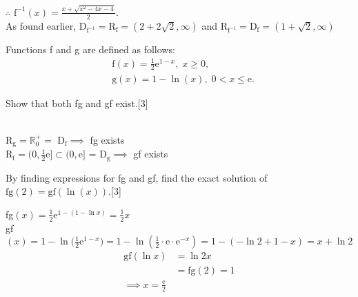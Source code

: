 \documentclass[12pt, a4 paper]{article}
\begin{document}
\begin{outline}[enumerate]
\begin{answer}
  $\therefore$\; $\textrm{f}^{-1}(x)=\frac{x+\sqrt{x^2-4x-4}}{2}$.\\
  As found earlier, $\textrm{D}_{\textrm{f}^{-1}}=\textrm{R}_{\textrm{f}}=(2+2\sqrt{2},\infty)$ and $\textrm{R}_{\textrm{f}^{-1}}=\textrm{D}_{\textrm{f}}=(1+\sqrt{2},\infty)$
 \end{answer}
 \1 Functions f and g are defined as follows:
 \begin{align*}
   & \textrm{f}(x)=\frac{1}{2}\mathrm{e}^{1-x},\;x\geq0, \\
   & \textrm{g}(x)=1-\ln{(x)},\;0<x\leq{\mathrm{e}}.
 \end{align*} %

 \2 Show that both fg and gf exist.\hfill[3]
 \begin{answer}
  \vspace{3mm}
  \color{black}
  \\
  \color{blue}
  R$_\textrm{g} = \mathbb{R}^+_0 =$ D$_\textrm{f}\implies$ fg exists \\
  R$_\textrm{f} = (0,\frac{1}{2}\mathrm{e}] \subset (0,\mathrm{e}]$ = D$_\textrm{g}\implies$ gf exists
 \end{answer}

 \2 By finding expressions for fg and gf, find the exact solution of $\textrm{fg}(2)=\textrm{gf}(\ln{(x)})$.\hfill[3]\\
 \begin{answer}
  fg$(x)=\frac{1}{2}\mathrm{e}^{1-(1-\ln{x})} = \frac{1}{2}x $ \\
  gf$(x) = 1-\ln{(\frac{1}{2}\mathrm{e}^{1-x}}) = 1-\ln{(\frac{1}{2}\cdot \mathrm{e} \cdot \mathrm{e}^{-x})} = 1-(-\ln2+1-x) = x+\ln2$
  \begin{align*}
   \textrm{gf}(\ln x) & = \ln2x              \\
                      & = \textrm{fg}(2) = 1 \\
   \implies x=\frac{\mathrm{e}}{2}
  \end{align*}
 \end{answer}


\end{outline}
\end{document}

